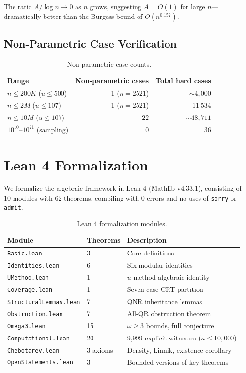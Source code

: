 \documentclass[11pt,a4paper]{article}
\theoremstyle{plain}
\theoremstyle{plain}
\theoremstyle{definition}
\numberwithin{equation}{section}
\begin{document}
The ratio $A/\log n \to 0$ as $n$ grows, suggesting $A = O(1)$ for large $n$---dramatically better than the Burgess bound of $O(n^{0.152})$.

\subsection{Non-Parametric Case Verification}

\begin{table}[h]
\centering
\begin{tabular}{lrr}
\toprule
Range & Non-parametric cases & Total hard cases \\
\midrule
$n \leq 200K$ ($u \leq 500$) & 1 ($n = 2521$) & $\sim 4{,}000$ \\
$n \leq 2M$ ($u \leq 107$) & 1 ($n = 2521$) & 11,534 \\
$n \leq 10M$ ($u \leq 107$) & 22 & $\sim 48{,}711$ \\
$10^{10}$--$10^{21}$ (sampling) & 0 & 36 \\
\bottomrule
\end{tabular}
\caption{Non-parametric case counts.}
\end{table}

\clearpage

\section{Lean 4 Formalization}

We formalize the algebraic framework in Lean 4 (Mathlib v4.33.1), consisting of 10 modules with 62 theorems, compiling with 0 errors and no uses of \texttt{sorry} or \texttt{admit}.

\begin{table}[h]
\centering
\begin{tabular}{lll}
\toprule
Module & Theorems & Description \\
\midrule
\texttt{Basic.lean} & 3 & Core definitions \\
\texttt{Identities.lean} & 6 & Six modular identities \\
\texttt{UMethod.lean} & 1 & $u$-method algebraic identity \\
\texttt{Coverage.lean} & 1 & Seven-case CRT partition \\
\texttt{StructuralLemmas.lean} & 7 & QNR inheritance lemmas \\
\texttt{Obstruction.lean} & 7 & All-QR obstruction theorem \\
\texttt{Omega3.lean} & 15 & $\omega \geq 3$ bounds, full conjecture \\
\texttt{Computational.lean} & 20 & 9,999 explicit witnesses ($n \leq 10{,}000$) \\
\texttt{Chebotarev.lean} & 3 axioms & Density, Linnik, existence corollary \\
\texttt{OpenStatements.lean} & 3 & Bounded versions of key theorems \\
\bottomrule
\end{tabular}
\caption{Lean 4 formalization modules.}
\end{table}
\end{document}
